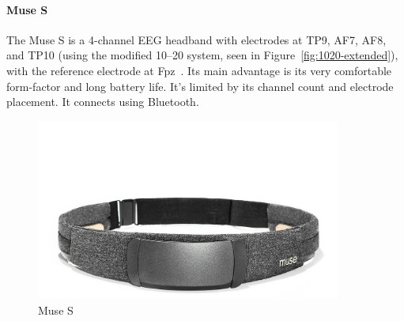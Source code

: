     \begin{minipage}{\textwidth}
        \paragraph*{Muse S}
        The Muse S is a 4-channel EEG headband with electrodes at TP9, AF7, AF8, and TP10 (using the modified 10--20 system, seen in Figure~\ref{fig:1020-extended}), with the reference electrode at Fpz~\cite{krigolson_choosing_2017}. Its main advantage is its very comfortable form-factor and long battery life. It's limited by its channel count and electrode placement. It connects using Bluetooth.

        \begin{figure}[H]
            \centering
            \includegraphics[trim=0 0 0 200,clip,width=100mm]{img/Muse-S.jpg}
            \caption{Muse S}\label{fig:museS}
        \end{figure}
    \end{minipage}

